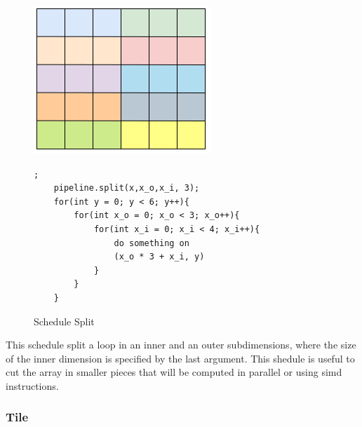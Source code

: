 \begin{figure}[H]

		\begin{minipage}[c]{\EIW}
			\centering
		\includegraphics[width=\textwidth]{Images/Split.png}
		\end{minipage}
		\begin{minipage}[c]{\ECW}
			\centering
			\begin{lstlisting}[label={code:reorder}];
	pipeline.split(x,x_o,x_i, 3);
	for(int y = 0; y < 6; y++){
		for(int x_o = 0; x_o < 3; x_o++){
			for(int x_i = 0; x_i < 4; x_i++){
				do something on
				(x_o * 3 + x_i, y)
			}
		}
	}
\end{lstlisting}
		\end{minipage}
		\caption{Schedule Split}
		\label{schedule:split}
\end{figure}

	This schedule split a loop in an inner and an outer subdimensions, where the size of the inner dimension is specified by the last argument. This shedule is useful to cut the array in smaller pieces that will be computed in parallel or using \gls{simd} instructions.

\subsubsection{Tile}


